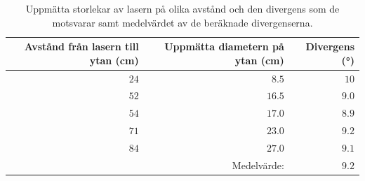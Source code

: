 \documentclass[a4paper]{article}
\begin{document}
\begin{table}[h]
	\centering
	\caption{Uppmätta storlekar av lasern på olika avstånd och den divergens som de motsvarar samt medelvärdet av de beräknade divergenserna.}
	\label{tab:div}
	\begin{tabular}{|rrr|}%
		\hline
		Avstånd från lasern till ytan (\si{\centi\meter}) & Uppmätta diametern på ytan (\si{\centi\meter}) & Divergens (\si{\degree}) \\
		\hline
		$24$ & $8.5$ & $10$ \\
		$52$ & $16.5$ & $9.0$ \\
		$54$ & $17.0$ & $8.9$ \\
		$71$ & $23.0$ & $9.2$ \\
		$84$ & $27.0$ & $9.1$ \\\hline
		& Medelvärde: & $9.2$ \\\hline
	\end{tabular}
\end{table}
\end{document}
